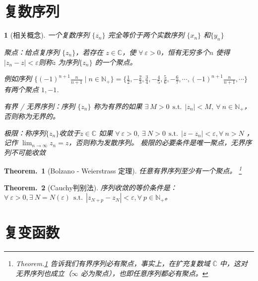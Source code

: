 \documentclass[UTF8]{report}
\def\C{\mathbb{C}}
\theoremstyle{MyLineTheoremStyle} %
\newtheorem{LineTheorem}{Theorem.\,}
\theoremstyle{MyBlockTheoremStyle} %
\theoremstyle{MySubsubsectionStyle} %
\newtheorem{definition}{}
\begin{document}
\section{复数序列}

\begin{definition}[相关概念]
    一个复数序列 $\{z_n\}$ 完全等价于两个实数序列 $\{x_n\}$ 和$\{y_n\}$
    \begin{circledenum}
        \item 聚点：给点复序列 $\{z_n\}$，若存在 $z \in \C$，使 $\forall\ \varepsilon >0$，恒有无穷多个$n$ 使得 $| z_n - z | < \varepsilon$则称$z$ 为序列$\{z_n\}$ 的一个聚点。
        {\par\color{gray}\small
        例如序列 $\{(-1)^{n+1}\frac n{n+1}\mid n \in \mathbb{N}_+\} =  \{\frac12,-\frac23,\frac34,-\frac45,\frac56,-\frac67,\cdots,(-1)^{n+1}\frac n{n+1},\cdots \}$ 有两个聚点 $1,-1$.
        \par}
        \item 有界 / 无界序列：序列 $\{z_n\}$ 称为有界的如果 $\exists\ M>0 \ \ \text{s.t.}\ \ | z_n | < M,\ \forall\ n \in \mathbb{N}_+$，否则称为无界的。
        \item 极限：称序列$\{z_n\}$收敛于$z \in \C$ 如果 $ \forall\ \varepsilon > 0,\ \exists\ N>0 \ \ \text{s.t.}\ \ | z - z_n | < \varepsilon, \forall\ n > N$ ，记作 $\displaystyle \lim_{n \rightarrow \infty} z_n = z $，否则称为发散序列。
        极限的必要条件是唯一聚点，无界序列不可能收敛
    \end{circledenum}
\end{definition}

\begin{LineTheorem}[Bolzano - Weierstrass 定理]\label{Bolzano - Weierstrass 定理}
任意有界序列至少有一个聚点。
\footnote{
    Theorem.\ref{Bolzano - Weierstrass 定理} 告诉我们有界序列必有聚点，事实上，在扩充复数域 $\overline{\C}$ 中，这对无界序列也成立（$\infty$ 必为聚点），也即任意序列都必有聚点。}
\end{LineTheorem}

\begin{LineTheorem}[Cauchy判别法]\label{Cauchy判别法}
序列收敛的等价条件是：$\forall\ \varepsilon > 0, \exists\ N = N(\varepsilon) \ \ \text{s.t.}\ \ | z_{N+p} - z_N | < \varepsilon, \forall\ p \in \mathbb{N}_+$。
\end{LineTheorem}

\section{复变函数}
\end{document}
